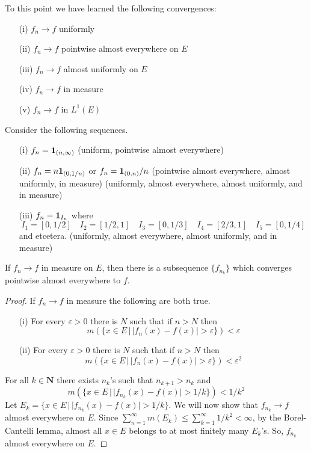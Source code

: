 \begin{ex}
To this point we have learned the following convergences:
\begin{itemize}
\item[(i)] $f_{n}\rightarrow f$ uniformly
\item[(ii)] $f_{n}\rightarrow f$ pointwise almost everywhere on $E$
\item[(iii)] $f_{n}\rightarrow f$ almost uniformly on $E$
\item[(iv)] $f_{n}\rightarrow f$ in measure
\item[(v)] $f_{n}\rightarrow f$ in $L^{1}(E)$
\end{itemize}
Consider the following sequences.
\begin{itemize}
\item[(i)] $f_{n}={\bf 1}_{(n,\infty )}$ (uniform, pointwise almost everywhere)
\item[(ii)] $f_{n}=n{\bf 1}_{(0,1/n)}$ or $f_{n}={\bf 1}_{(0,n)}/n$ (pointwise almost everywhere, almost uniformly, in measure) (uniformly, almost everywhere, almost uniformly, and in measure)
\item[(iii)] $f_{n}={\bf 1}_{I_{n}}$ where 
\[I_1=[0,1/2]\quad I_2=[1/2,1]\quad I_3=[0,1/3]\quad I_4=[2/3,1]\quad I_5=[0,1/4]\]
and etcetera. (uniformly, almost everywhere, almost uniformly, and in measure)
\end{itemize}
\end{ex}
\vspace{2ex}
\begin{thm}
If $f_{n}\rightarrow f$ in measure on $E$, then there is a subsequence $\{f_{n_{k}}\}$ which converges pointwise almost everywhere to $f$. 
\end{thm}
\vspace{2ex}
\begin{proof}
If $f_{n}\rightarrow f$ in measure the following are both true.
\begin{itemize}
\item[(i)] For every $\varepsilon >0$ there is $N$ such that if $n>N$ then
\[m(\{x\in E\,|\,|f_{n}(x)-f(x)|>\varepsilon \})<\varepsilon \]
\item[(ii)] For every $\varepsilon >0$ there is $N$ such that if $n>N$ then
\[m(\{x\in E\,|\,|f_{n}(x)-f(x)|>\varepsilon \})<\varepsilon ^2\]
\end{itemize}
For all $k\in {\bm N}$ there exists $n_{k}$'s such that $n_{k+1}>n_{k}$ and \[m(\{x\in E\,|\,|f_{n_{k}}(x)-f(x)|> 1/k\})< 1/k^2\]
Let $E_{k}=\{x\in E\,|\,|f_{n_{k}}(x)-f(x)|> 1/k \}$. We will now show that $f_{n_{k}}\rightarrow f$ almost everywhere on $E$. Since $\sum ^{\infty }_{n=1}m(E_{k})\leq \sum _{k=1}^{\infty }1/k^2<\infty $, by the Borel-Cantelli lemma, almost all $x\in E$ belongs to at most finitely many $E_{k}$'s. So, $f_{n_{k}}$ almost everywhere on $E$. 
\end{proof}
